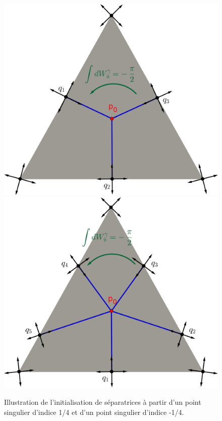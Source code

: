 \begin{figure}[!h]
\centering
\includegraphics[scale=0.755]{images/triangle separatrices 3.png}
\includegraphics[scale=0.755]{images/triangle separatrices 5.png}
\caption{Illustration de l'initialisation de séparatrices à partir d'un point singulier d'indice 1/4 et d'un point singulier d'indice -1/4.}
\label{fig:init_streams_int}
\end{figure}

